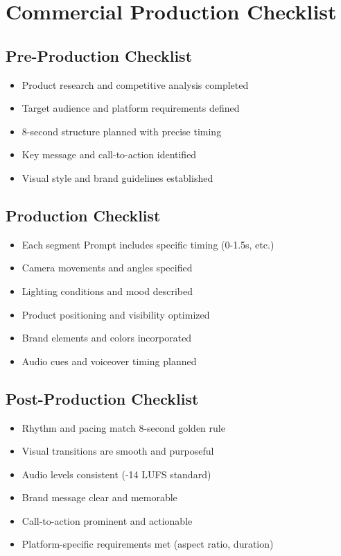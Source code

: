 \section*{Commercial Production Checklist}

\subsection*{Pre-Production Checklist}
\begin{itemize}
\item[$\square$] Product research and competitive analysis completed
\item[$\square$] Target audience and platform requirements defined
\item[$\square$] 8-second structure planned with precise timing
\item[$\square$] Key message and call-to-action identified
\item[$\square$] Visual style and brand guidelines established
\end{itemize}

\subsection*{Production Checklist}
\begin{itemize}
\item[$\square$] Each segment Prompt includes specific timing (0-1.5s, etc.)
\item[$\square$] Camera movements and angles specified
\item[$\square$] Lighting conditions and mood described
\item[$\square$] Product positioning and visibility optimized
\item[$\square$] Brand elements and colors incorporated
\item[$\square$] Audio cues and voiceover timing planned
\end{itemize}

\subsection*{Post-Production Checklist}
\begin{itemize}
\item[$\square$] Rhythm and pacing match 8-second golden rule
\item[$\square$] Visual transitions are smooth and purposeful
\item[$\square$] Audio levels consistent (-14 LUFS standard)
\item[$\square$] Brand message clear and memorable
\item[$\square$] Call-to-action prominent and actionable
\item[$\square$] Platform-specific requirements met (aspect ratio, duration)
\end{itemize}

